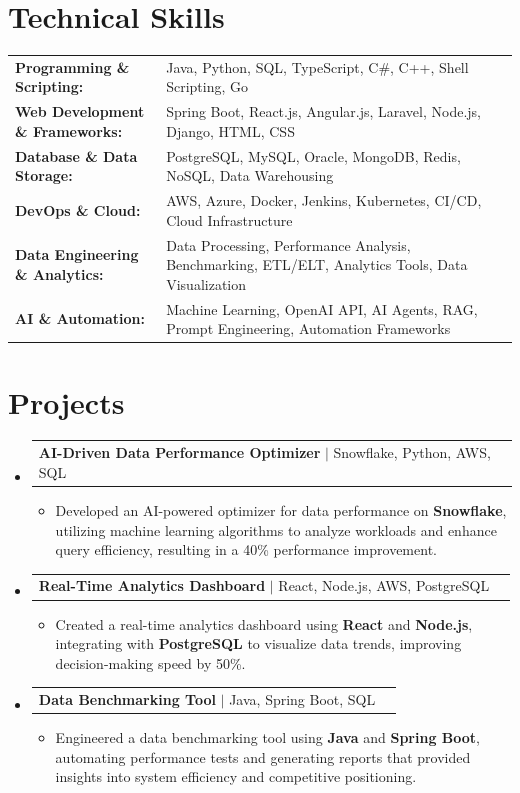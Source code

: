 \documentclass[letterpaper,10pt]{article}
\makeatletter
\newcommand{\resumeItem}[1]{
  \item{\fontsize{8pt}{9pt}\selectfont
    #1 \vspace{-3pt}
  }
}
\newcommand{\resumeProjectHeading}[2]{
    \item
    \begin{tabular*}{1.001\textwidth}{l@{\extracolsep{\fill}}r}
      \fontsize{8.5pt}{10pt}#1 & \textbf{\fontsize{8.5pt}{10pt} #2}\\
    \end{tabular*}\vspace{-7pt}
}
\newcommand{\resumeSubHeadingListStart}{\begin{itemize}[leftmargin=0pt, label={}]}
\newcommand{\resumeSubHeadingListEnd}{\end{itemize}}
\newcommand{\resumeItemListStart}{\begin{itemize}[leftmargin=*]}
\newcommand{\resumeItemListEnd}{\end{itemize}\vspace{-5pt}}
\makeatother
\begin{document}
\section{Technical Skills}
        \vspace{-14pt}
        \begin{table}[h]
            \fontsize{8pt}{9pt}\selectfont
            \begin{tabular}{p{0.3\linewidth} p{0.7\linewidth}}
                \textbf{Programming \& Scripting:} & Java, Python, SQL, TypeScript, C\#, C++, Shell Scripting, Go \\
                \textbf{Web Development \& Frameworks:} & Spring Boot, React.js, Angular.js, Laravel, Node.js, Django, HTML, CSS \\
                \textbf{Database \& Data Storage:} & PostgreSQL, MySQL, Oracle, MongoDB, Redis, NoSQL, Data Warehousing \\
                \textbf{DevOps \& Cloud:} & AWS, Azure, Docker, Jenkins, Kubernetes, CI/CD, Cloud Infrastructure \\
                \textbf{Data Engineering \& Analytics:} & Data Processing, Performance Analysis, Benchmarking, ETL/ELT, Analytics Tools, Data Visualization \\
                \textbf{AI \& Automation:} & Machine Learning, OpenAI API, AI Agents, RAG, Prompt Engineering, Automation Frameworks \\
            \end{tabular}
        \end{table}
 \vspace{-18pt}

\section{Projects}
    \vspace{-5pt}
    \resumeSubHeadingListStart
          \resumeProjectHeading
            {\textbf{AI-Driven Data Performance Optimizer} $|$ Snowflake, Python, AWS, SQL}{}
            \resumeItemListStart
                \resumeItem{Developed an AI-powered optimizer for data performance on \textbf{Snowflake}, utilizing machine learning algorithms to analyze workloads and enhance query efficiency, resulting in a 40\% performance improvement.}
            \resumeItemListEnd
        \vspace{-12pt}
    
        \resumeProjectHeading
            {\textbf{Real-Time Analytics Dashboard} $|$ React, Node.js, AWS, PostgreSQL}{}
        \resumeItemListStart
                \resumeItem{Created a real-time analytics dashboard using \textbf{React} and \textbf{Node.js}, integrating with \textbf{PostgreSQL} to visualize data trends, improving decision-making speed by 50\%.}
        \resumeItemListEnd
      \vspace{-12pt}
      \resumeProjectHeading
        {\textbf{Data Benchmarking Tool} $|$ Java, Spring Boot, SQL}{}
    \resumeItemListStart
            \resumeItem{Engineered a data benchmarking tool using \textbf{Java} and \textbf{Spring Boot}, automating performance tests and generating reports that provided insights into system efficiency and competitive positioning.}
    \resumeItemListEnd
    \resumeSubHeadingListEnd
\end{document}

